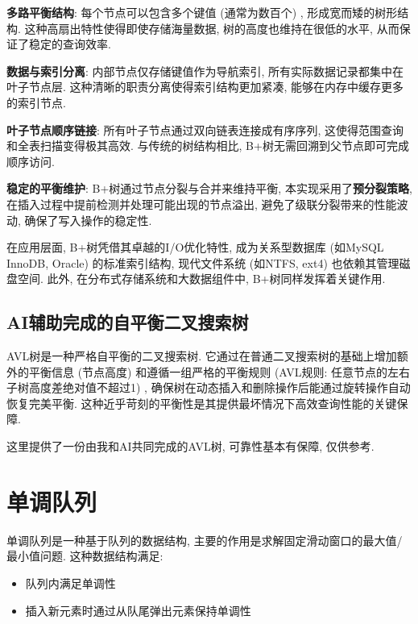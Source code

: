 \documentclass[a4paper]{ctexbook}
\begin{document}
\textbf{多路平衡结构}: 每个节点可以包含多个键值 (通常为数百个) , 形成宽而矮的树形结构. 这种高扇出特性使得即使存储海量数据, 树的高度也维持在很低的水平, 从而保证了稳定的查询效率.

\textbf{数据与索引分离}: 内部节点仅存储键值作为导航索引, 所有实际数据记录都集中在叶子节点层. 这种清晰的职责分离使得索引结构更加紧凑, 能够在内存中缓存更多的索引节点.

\textbf{叶子节点顺序链接}: 所有叶子节点通过双向链表连接成有序序列, 这使得范围查询和全表扫描变得极其高效. 与传统的树结构相比, B+树无需回溯到父节点即可完成顺序访问.

\textbf{稳定的平衡维护}: B+树通过节点分裂与合并来维持平衡, 本实现采用了\textbf{预分裂策略}, 在插入过程中提前检测并处理可能出现的节点溢出, 避免了级联分裂带来的性能波动, 确保了写入操作的稳定性.

在应用层面, B+树凭借其卓越的I/O优化特性, 成为关系型数据库 (如MySQL InnoDB, Oracle) 的标准索引结构, 现代文件系统 (如NTFS, ext4) 也依赖其管理磁盘空间. 此外, 在分布式存储系统和大数据组件中, B+树同样发挥着关键作用.



\subsection*{AI辅助完成的自平衡二叉搜索树}

AVL树是一种严格自平衡的二叉搜索树. 它通过在普通二叉搜索树的基础上增加额外的平衡信息 (节点高度) 和遵循一组严格的平衡规则 (AVL规则: 任意节点的左右子树高度差绝对值不超过1) , 确保树在动态插入和删除操作后能通过旋转操作自动恢复完美平衡. 这种近乎苛刻的平衡性是其提供最坏情况下高效查询性能的关键保障.

这里提供了一份由我和AI共同完成的AVL树, 可靠性基本有保障, 仅供参考.



\section{单调队列}
单调队列是一种基于队列的数据结构, 主要的作用是求解固定滑动窗口的最大值/最小值问题. 这种数据结构满足:
\begin{itemize}
	\item 队列内满足单调性
	\item 插入新元素时通过从队尾弹出元素保持单调性
\end{itemize}
\end{document}
